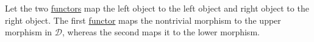 Let the two \href{doc/1 math/Seven Sketches in Compositionality/Chapter 3: Databases/3 Functors, natural transformations, and databases/2 Functors/1 Functor}{functors} map the left object to the left object and right object to the right object. The first \href{doc/1 math/Seven Sketches in Compositionality/Chapter 3: Databases/3 Functors, natural transformations, and databases/2 Functors/1 Functor}{functor} maps the nontrivial morphism to the upper morphism in $\mathcal{D}$, whereas the second maps it to the lower morphism.
